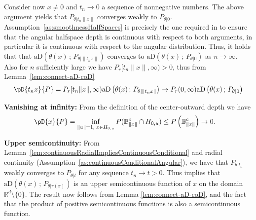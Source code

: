 \documentclass{article}
\numberwithin{equation}{section}
\newcommand{\rset}{\mathbb{R}}
\newcommand{\ball}{\mathbb{B}}
\newcommand{\AHS}[1]{H_{0, {#1}} }
\newcommand{\coD}[2]{\pD{#1}{#2}}
\newcommand{\aD}[2]{{\mathrm{aD}}\left({#1}\,;\,{#2}\right)}
\begin{document}
Consider now $x\neq 0$ and $t_n\to 0$ a sequence of nonnegative numbers. The above argument yields that $P_{\theta|t_n\|x\|}$ converges weakly to $P_{\theta|0}$. Assumption~\ref{as:smoothnessHalfSpaces} is precisely the one required in \citep[][Theorem 10]{nagy2024theoretical} to ensure that the angular halfspace depth is continuous with respect to both arguments, in particular it is continuous with respect to the angular distribution. %
    Thus, it holds that %
    that \(\aD{\theta(x)}{P_{\theta|\|t_nx\|}}\) converges to
    \(\aD{\theta(x)}{P_{\theta|0}}\) as \(n\to \infty\).
    Also for $n$ sufficiently large we have $P_{r}[t_n\|x\|, \infty) >0$, thus from Lemma~\ref{lem:connect-aD-coD}
    $$
    \coD{t_nx}{P} =  P_r[t_n\|x\|,\infty) \aD{\theta(x)}{P_{\theta|\|t_n x\|}}
    \to  P_r(0,\infty) \aD{\theta(x)}{P_{\theta| 0}}%
    $$
\medskip

    \noindent\textbf{Vanishing at infinity:} From the definition of
    the center-outward depth we have
    \begin{align*}
        \coD{x}{P} & = \inf_{\| u \| = 1,\; x \in \AHS{u} }P(
        \ball_{\|x\|}^c\cap \AHS{u} )\leq P \left(\ball_{\|x\|}^c\right)\to 0.
    \end{align*}
\medskip

    \noindent\textbf{Upper semicontinuity:}
   From Lemma~\ref{lem:continuousRadialImpliesContinuousConditional} and radial continuity (Assumption~\ref{as:continuousConditionalAngular}), we have that  $P_{\theta|t_n}$ weakly converges to $P_{\theta|t}$ for any sequence $t_n\to t>0$. Thus \cite[Theorem 3]{nagy2024theoretical} implies that
    \(\aD{\theta(x)}{P_{\theta|r(x)}}\)
    is an upper semicontinuous function of \(x\) on the domain $\rset^d\setminus\{0\}$. The result now
    follows from Lemma \ref{lem:connect-aD-coD},
    and the fact that the product of positive
    semicontinuous functions is also a semicontinuous function.
\medskip
\end{document}
